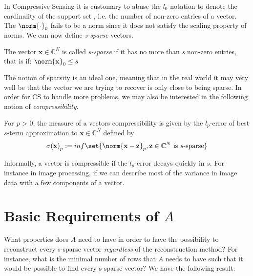 In Compressive Sensing it is customary to abuse the $l_{0}$ notation to denote the cardinality of the support set , i.e. the number of non-zero entries of a vector. The $\norm{\cdot}_{0}$ fails to be a norm since it does not satisfy the scaling property of norms. We can now define \emph{s-sparse} vectors.


\begin{tcolorbox}[colback=blue,colframe=white]
\begin{definition}
The vector $\mathbf{x} \in \mathbb{C}^{N}$ is called \emph{s-sparse} if it has no more than \emph{s} non-zero entries, that is if: 
$\norm{\mathbf{x}}_{0} \leq s$	
	
	
\end{definition}	
\end{tcolorbox}


The notion of sparsity is an ideal one, meaning that in the real world it may very well be that the vector we are trying to recover is only close to being sparse. In order for CS to handle more problems, we may also be interested in the following notion of  \emph{compressibility}. 

\begin{tcolorbox}[colback=blue,colframe=white]

\begin{definition}
For \emph{p} > 0, the measure of a vectors compressibility is given by the $l_p$-error of best $s$-term approximation to $\mathbf{x} \in \mathbb{C}^{N}$ defined by 
\begin{equation*}
\sigma \mathbf{(x)}_{p}:= inf \set{\norm{ \mathbf{x}-\mathbf{z}}_{p}, \mathbf{z} \in \mathbb{C}^{N} \text{ is } s\text{-sparse}}
\end{equation*}
\end{definition}	
\end{tcolorbox}


Informally, a vector is compressible if the $l_{p}$-error decays quickly in $s$. For instance in image processing, if we can describe most of the variance in image data with a few components of a vector. 


\section{Basic Requirements of $A$} 

What properties does $A$ need to have in order to have the possibility to reconstruct every s-sparse vector \emph{regardless} of the reconstruction method? For instance, what is the minimal number of rows that $A$ needs to have such that it would be possible to find every s-sparse vector? We have the following result: 

